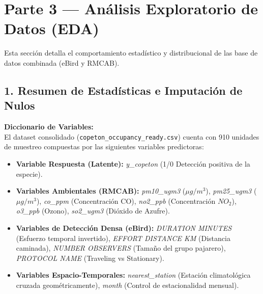 \documentclass[12pt]{article}
\begin{document}
\section{Parte 3 --- Análisis Exploratorio de Datos (EDA)}

Esta sección detalla el comportamiento estadístico y distribucional de las base de datos combinada (eBird y RMCAB).

\subsection*{1. Resumen de Estadísticas e Imputación de Nulos}

\textbf{Diccionario de Variables:}\\
El dataset consolidado (\texttt{copeton\_occupancy\_ready.csv}) cuenta con 910 unidades de muestreo compuestas por las siguientes variables predictoras:
\begin{itemize}
    \item \textbf{Variable Respuesta (Latente):} \textit{y\_copeton} (1/0 Detección positiva de la especie).
    \item \textbf{Variables Ambientales (RMCAB):} \textit{pm10\_ugm3} ($\mu g/m^3$), \textit{pm25\_ugm3} ($\mu g/m^3$), \textit{co\_ppm} (Concentración CO), \textit{no2\_ppb} (Concentración $NO_2$), \textit{o3\_ppb} (Ozono), \textit{so2\_ugm3} (Dióxido de Azufre).
    \item \textbf{Variables de Detección Densa (eBird):} \textit{DURATION MINUTES} (Esfuerzo temporal invertido), \textit{EFFORT DISTANCE KM} (Distancia caminada), \textit{NUMBER OBSERVERS} (Tamaño del grupo pajarero), \textit{PROTOCOL NAME} (Traveling vs Stationary).
    \item \textbf{Variables Espacio-Temporales:} \textit{nearest\_station} (Estación climatológica cruzada geométricamente), \textit{month} (Control de estacionalidad mensual).
\end{itemize}
\end{document}

